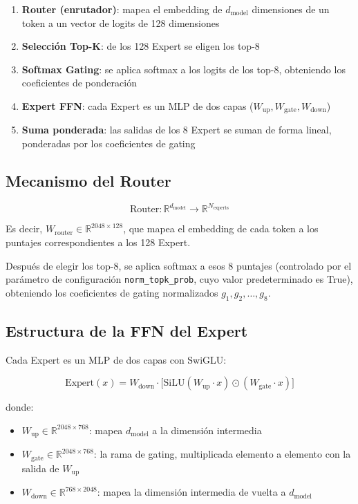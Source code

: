 \documentclass[a4paper]{article}
\begin{document}
\begin{enumerate}
  \item \textbf{Router (enrutador)}: mapea el embedding de $d_{\text{model}}$ dimensiones de un token a un vector de logits de 128 dimensiones
  \item \textbf{Selección Top-K}: de los 128 Expert se eligen los top-8
  \item \textbf{Softmax Gating}: se aplica softmax a los logits de los top-8, obteniendo los coeficientes de ponderación
  \item \textbf{Expert FFN}: cada Expert es un MLP de dos capas ($W_{\text{up}}, W_{\text{gate}}, W_{\text{down}}$)
  \item \textbf{Suma ponderada}: las salidas de los 8 Expert se suman de forma lineal, ponderadas por los coeficientes de gating
\end{enumerate}

\subsection{Mecanismo del Router}

$$
\text{Router}: \mathbb{R}^{d_{\text{model}}} \to \mathbb{R}^{N_{\text{experts}}}
$$

Es decir, $W_{\text{router}} \in \mathbb{R}^{2048 \times 128}$, que mapea el embedding de cada token a los puntajes correspondientes a los 128 Expert.

Después de elegir los top-8, se aplica softmax a esos 8 puntajes (controlado por el parámetro de configuración \texttt{norm\_topk\_prob}, cuyo valor predeterminado es True), obteniendo los coeficientes de gating normalizados $g_1, g_2, \ldots, g_8$.

\subsection{Estructura de la FFN del Expert}

Cada Expert es un MLP de dos capas con SwiGLU:

$$
\text{Expert}(x) = W_{\text{down}} \cdot \big[ \text{SiLU}(W_{\text{up}} \cdot x) \odot (W_{\text{gate}} \cdot x) \big]
$$

donde:
\begin{itemize}
  \item $W_{\text{up}} \in \mathbb{R}^{2048 \times 768}$: mapea $d_{\text{model}}$ a la dimensión intermedia
  \item $W_{\text{gate}} \in \mathbb{R}^{2048 \times 768}$: la rama de gating, multiplicada elemento a elemento con la salida de $W_{\text{up}}$
  \item $W_{\text{down}} \in \mathbb{R}^{768 \times 2048}$: mapea la dimensión intermedia de vuelta a $d_{\text{model}}$
\end{itemize}
\end{document}
